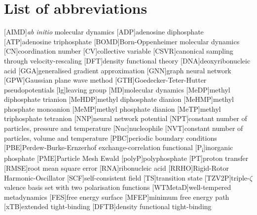 \chapter*{List of abbreviations}

\begin{acronym}
    [AIMD]{\textit{ab initio} molecular dynamics}
    [ADP]{adenosine diphosphate}
    [ATP]{adenosine triphosphate}
    [BOMD]{Born-Oppenheimer molecular dynamics}
    [CN]{coordination number}
    [CV]{collective variable}
    [CSVR]{canonical sampling through velocity-rescaling}
    [DFT]{density functional theory}
    [DNA]{deoxyribonucleic acid}
    [GGA]{generalised gradient approximation}
    [GNN]{graph neural network}
    [GPW]{Gaussian plane wave method}
    [GTH]{Goedecker-Teter-Hutter pseudopotentials}
    [lg]{leaving group}
    [MD]{molecular dynamics}
    [MeDP]{methyl diphosphate trianion}
    [MeHDP]{methyl diphosphate dianion}
    [MeHMP]{methyl phosphate monoanion}
    [MeMP]{methyl phosphate dianion}
    [MeTP]{methyl triphosphate tetranion}
    [NNP]{neural network potential}
    [NPT]{constant number of particles, pressure and temperature}
    [Nuc]{nucleophile}
    [NVT]{constant number of particles, volume and temperature}
    [PBC]{periodic boundary conditions}
    [PBE]{Perdew-Burke-Ernzerhof exchange-correlation functional}
    [P\textsubscript{i}]{inorganic phosphate}
    [PME]{Particle Mesh Ewald}
    [polyP]{polyphosphate}
    [PT]{proton transfer}
    [RMSE]{root mean square error}
    [RNA]{ribonucleic acid}
    [RRHO]{Rigid-Rotor Harmonic-Oscillator}
    [SCF]{self-consistent field}
    [TS]{transition state}
    [TZV2P]{triple-$\zeta$ valence basis set with two polarisation functions}
    [WTMetaD]{well-tempered metadynamics}
    [FES]{free energy surface}
    [MFEP]{minimum free energy path}
    [xTB]{extended tight-binding}
    [DFTB]{density functional tight-binding}
\end{acronym}


